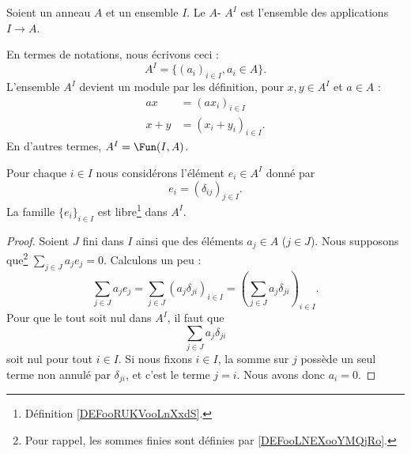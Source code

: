 \begin{lemmaDef}        \label{DEFooLCJEooBvVmkV}
    Soient un anneau \( A\) et un ensemble \( I\). Le \( A\)- \( A^I\) est l'ensemble des applications \( I\to A\).

    En termes de notations, nous écrivons ceci :
    \begin{equation}
        A^I=\{ (a_i)_{i\in I},a_i\in A \}.
    \end{equation}
    L'ensemble \( A^I\) devient un module par les définition, pour \( x,y\in A^I\) et \( a\in A\) :
    \begin{subequations}
        \begin{align}
            ax&=(ax_i)_{i\in I}\\
            x+y&=(x_i+y_i)_{i\in I}     \label{EQooODBMooQKLUgd}.
        \end{align}
    \end{subequations}
    En d'autres termes, \( A^I=\Fun(I,A)\).
\end{lemmaDef}

\begin{lemma}
    Pour chaque \( i\in I\) nous considérons l'élément \( e_i\in A^I\) donné par
    \begin{equation}
        e_i=(\delta_{ij})_{j\in I}.
    \end{equation}
    La famille \( \{ e_i \}_{i\in I}\) est libre\footnote{Définition \ref{DEFooRUKVooLnXxdS}.} dans \( A^I\).
\end{lemma}

\begin{proof}
    Soient \( J\) fini dans \( I\) ainsi que des éléments \( a_j\in A\) (\( j\in J\)). Nous supposons que\footnote{Pour rappel, les sommes finies sont définies par \ref{DEFooLNEXooYMQjRo}.} \( \sum_{j\in J}a_je_j=0\). Calculons un peu :
    \begin{equation}
        \sum_{j\in J}a_je_j=\sum_{j\in J}(a_j\delta_{ji})_{i\in I}=\left( \sum_{j\in J}a_j\delta_{ji} \right)_{i\in I}.
    \end{equation}
    Pour que le tout soit nul dans \( A^I\), il faut que
    \begin{equation}
        \sum_{j\in J}a_j\delta_{ji}
    \end{equation}
    soit nul pour tout \( i\in I\). Si nous fixons \( i\in I\), la somme sur \( j\) possède un seul terme non annulé par \( \delta_{ji}\), et c'est le terme \( j=i\). Nous avons donc \( a_i=0\).
\end{proof}

